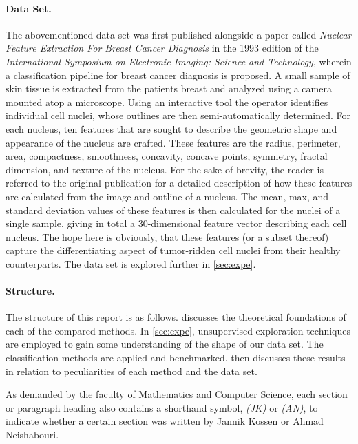 \documentclass[12pt, a4paper]{scrartcl}
\begin{document}
\paragraph{Data Set.} The abovementioned data set was first published alongside a paper called \emph{Nuclear Feature Extraction For Breast Cancer Diagnosis} \cite{street1993nuclear} in the 1993 edition of the \emph{International Symposium on Electronic Imaging: Science and Technology}, wherein a classification pipeline for breast cancer diagnosis is proposed. A small sample of skin tissue is extracted from the patients breast and analyzed using a camera mounted atop a microscope. Using an interactive tool the operator identifies individual cell nuclei, whose outlines are then semi-automatically determined. For each nucleus, ten features that are sought to describe the geometric shape and appearance of the nucleus are crafted. These features are the radius, perimeter, area, compactness, smoothness, concavity, concave points, symmetry, fractal dimension, and texture of the nucleus.
For the sake of brevity, the reader is referred to the original publication \cite{street1993nuclear} for a detailed description of how these features are calculated from the image and outline of a nucleus. 
The mean, max, and standard deviation values of these features is then calculated for the nuclei of a single sample, giving in total a 30-dimensional feature vector describing each cell nucleus.
The hope here is obviously, that these features (or a subset thereof) capture the differentiating aspect of tumor-ridden cell nuclei from their healthy counterparts. The data set is explored further in \cref{sec:expe}.

\paragraph{Structure.} The structure of this report is as follows.  discusses the theoretical foundations of each of the compared methods. In \cref{sec:expe}, unsupervised exploration techniques are employed to gain some understanding of the shape of our data set. The classification methods are applied and benchmarked.  then discusses these results in relation to peculiarities of each method and the data set.

As demanded by the faculty of Mathematics and Computer Science, each section or paragraph heading also contains a shorthand symbol, \emph{(JK)} or \emph{(AN)}, to indicate whether a certain section was written by Jannik Kossen or Ahmad Neishabouri.
\end{document}
